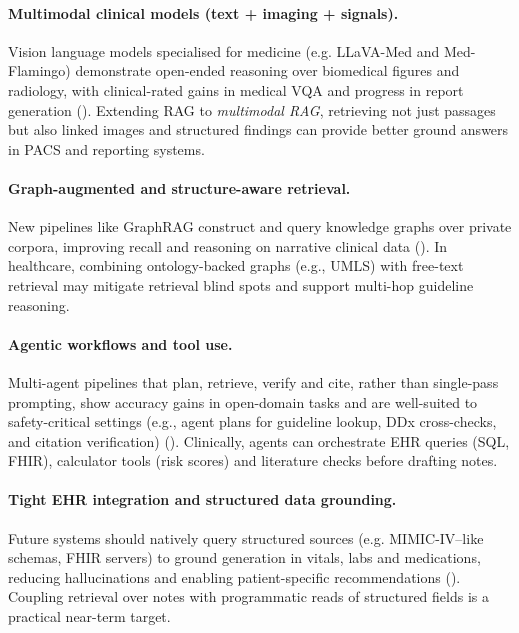 \paragraph{Multimodal clinical models (text + imaging + signals).}
Vision language models specialised for medicine (e.g. LLaVA-Med and Med-Flamingo) demonstrate open-ended reasoning over biomedical figures and radiology, with clinical-rated gains in medical VQA and progress in report generation (\citep{llavamed2023,moor2023medflamingo,nature2024flamingocxr}). Extending RAG to \emph{multimodal RAG}, retrieving not just passages but also linked images and structured findings can provide better ground answers in PACS and reporting systems.

\paragraph{Graph-augmented and structure-aware retrieval.}
New pipelines like GraphRAG construct and query knowledge graphs over private corpora, improving recall and reasoning on narrative clinical data (\citep{larson2024graphrag,graphrag2024arxiv}). In healthcare, combining ontology-backed graphs (e.g., UMLS) with free-text retrieval may mitigate retrieval blind spots and support multi-hop guideline reasoning.

\paragraph{Agentic workflows and tool use.}
Multi-agent pipelines that plan, retrieve, verify and cite, rather than single-pass prompting, show accuracy gains in open-domain tasks and are well-suited to safety-critical settings (e.g., agent plans for guideline lookup, DDx cross-checks, and citation verification) (\citep{sun2025agenticrag}). Clinically, agents can orchestrate EHR queries (SQL, FHIR), calculator tools (risk scores) and literature checks before drafting notes.

\paragraph{Tight EHR integration and structured data grounding.}
Future systems should natively query structured sources (e.g. MIMIC-IV–like schemas, FHIR servers) to ground generation in vitals, labs and medications, reducing hallucinations and enabling patient-specific recommendations (\citep{yang2022gatortron}). Coupling retrieval over notes with programmatic reads of structured fields is a practical near-term target.

